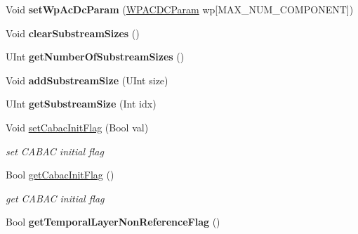 \begin{DoxyCompactItemize}
\item 
\mbox{\label{class_t_com_slice_a37e029fc02056f2bd63a9f323bb2d5a5}} 
Void {\bfseries set\+Wp\+Ac\+Dc\+Param} (\hyperlink{struct_w_p_a_c_d_c_param}{W\+P\+A\+C\+D\+C\+Param} wp\mbox{[}M\+A\+X\+\_\+\+N\+U\+M\+\_\+\+C\+O\+M\+P\+O\+N\+E\+NT\mbox{]})
\item 
\mbox{\label{class_t_com_slice_a65d7e9fb80308ea2e574f7846bc42319}} 
Void {\bfseries clear\+Substream\+Sizes} ()
\item 
\mbox{\label{class_t_com_slice_a356181377caf24561e2a751b468a55bd}} 
U\+Int {\bfseries get\+Number\+Of\+Substream\+Sizes} ()
\item 
\mbox{\label{class_t_com_slice_aa6e63dbe7de9d2fbc92b98b0df0d6d43}} 
Void {\bfseries add\+Substream\+Size} (U\+Int size)
\item 
\mbox{\label{class_t_com_slice_a4c233269244764c834f87986c6237d15}} 
U\+Int {\bfseries get\+Substream\+Size} (Int idx)
\item 
\mbox{\label{class_t_com_slice_a30d1a67ddfad800ce274dedb0e30f02e}} 
Void \hyperlink{class_t_com_slice_a30d1a67ddfad800ce274dedb0e30f02e}{set\+Cabac\+Init\+Flag} (Bool val)
\begin{DoxyCompactList}\small\item\em set C\+A\+B\+AC initial flag \end{DoxyCompactList}\item 
\mbox{\label{class_t_com_slice_a3af7039ba998848de34d44925c02069e}} 
Bool \hyperlink{class_t_com_slice_a3af7039ba998848de34d44925c02069e}{get\+Cabac\+Init\+Flag} ()
\begin{DoxyCompactList}\small\item\em get C\+A\+B\+AC initial flag \end{DoxyCompactList}\item 
\mbox{\label{class_t_com_slice_a01c1c80267b1740c41ad71a2587c64f2}} 
Bool {\bfseries get\+Temporal\+Layer\+Non\+Reference\+Flag} ()
\item 
\mbox{\label{class_t_com_slice_ac47bae1a271167352efc52844053fcbf}} 

\end{DoxyCompactItemize}
